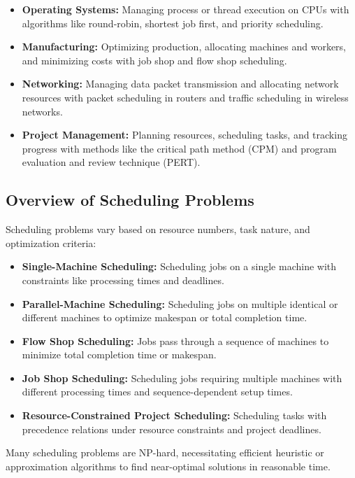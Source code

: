 \documentclass[12pt]{book} %
\begin{document}
\begin{itemize}
    \item \textbf{Operating Systems:} Managing process or thread execution on CPUs with algorithms like round-robin, shortest job first, and priority scheduling.
    \item \textbf{Manufacturing:} Optimizing production, allocating machines and workers, and minimizing costs with job shop and flow shop scheduling.
    \item \textbf{Networking:} Managing data packet transmission and allocating network resources with packet scheduling in routers and traffic scheduling in wireless networks.
    \item \textbf{Project Management:} Planning resources, scheduling tasks, and tracking progress with methods like the critical path method (CPM) and program evaluation and review technique (PERT).
\end{itemize}

\subsection{Overview of Scheduling Problems}

Scheduling problems vary based on resource numbers, task nature, and optimization criteria:

\begin{itemize}
    \item \textbf{Single-Machine Scheduling:} Scheduling jobs on a single machine with constraints like processing times and deadlines.
    \item \textbf{Parallel-Machine Scheduling:} Scheduling jobs on multiple identical or different machines to optimize makespan or total completion time.
    \item \textbf{Flow Shop Scheduling:} Jobs pass through a sequence of machines to minimize total completion time or makespan.
    \item \textbf{Job Shop Scheduling:} Scheduling jobs requiring multiple machines with different processing times and sequence-dependent setup times.
    \item \textbf{Resource-Constrained Project Scheduling:} Scheduling tasks with precedence relations under resource constraints and project deadlines.
\end{itemize}

Many scheduling problems are NP-hard, necessitating efficient heuristic or approximation algorithms to find near-optimal solutions in reasonable time.
\end{document}
